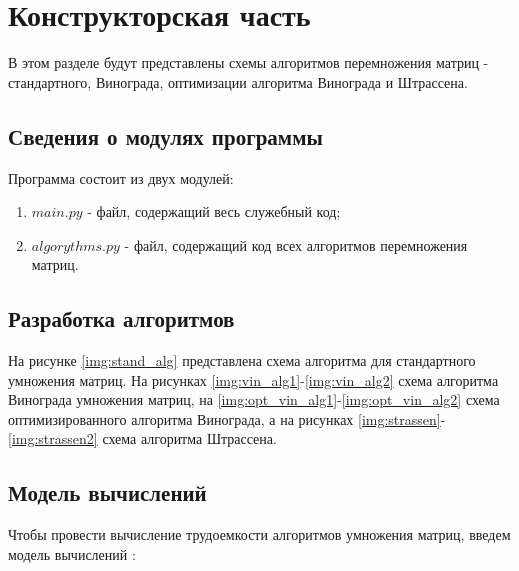 \chapter{Конструкторская часть}
В этом разделе будут представлены схемы алгоритмов перемножения матриц - стандартного, Винограда, оптимизации алгоритма Винограда и Штрассена.

\section{Сведения о модулях программы}
Программа состоит из двух модулей:
\begin{enumerate}[label=\arabic*)]
	\item $main.py$ - файл, содержащий весь служебный код;
    \item $algorythms.py$ - файл, содержащий код всех алгоритмов перемножения матриц. \newline
\end{enumerate}


\section{Разработка алгоритмов}
На рисунке \ref{img:stand_alg} представлена схема алгоритма для стандартного умножения матриц. На рисунках \ref{img:vin_alg1}-\ref{img:vin_alg2} схема алгоритма Винограда умножения матриц, на \ref{img:opt_vin_alg1}-\ref{img:opt_vin_alg2} схема оптимизированного алгоритма Винограда, а на рисунках \ref{img:strassen}-\ref{img:strassen2} схема алгоритма Штрассена. 


\clearpage


\section{Модель вычислений}

Чтобы провести вычисление трудоемкости алгоритмов умножения матриц, введем модель вычислений \cite{model}:

